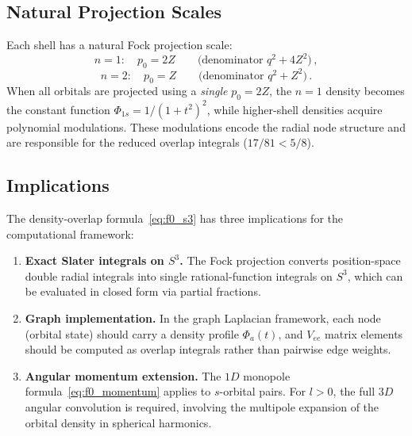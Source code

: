 \subsection{Natural Projection Scales}

Each shell has a natural Fock projection scale:
\begin{equation}
  n = 1: \quad p_0 = 2Z \qquad\text{(denominator } q^2 + 4Z^2\text{)} \,,
\end{equation}
\begin{equation}
  n = 2: \quad p_0 = Z \qquad\text{(denominator } q^2 + Z^2\text{)} \,.
\end{equation}
When all orbitals are projected using a \emph{single} $p_0 = 2Z$, the
$n=1$ density becomes the constant function $\Phi_{1s} = 1/(1+t^2)^2$,
while higher-shell densities acquire polynomial modulations. These
modulations encode the radial node structure and are responsible for
the reduced overlap integrals ($17/81 < 5/8$).

\subsection{Implications}
\label{sec:vee_implications}

The density-overlap formula~\eqref{eq:f0_s3} has three implications
for the computational framework:

\begin{enumerate}
  \item \textbf{Exact Slater integrals on $S^3$.}
    The Fock projection converts position-space double radial integrals
    into single rational-function integrals on $S^3$, which can be
    evaluated in closed form via partial fractions.

  \item \textbf{Graph implementation.}
    In the graph Laplacian framework, each node (orbital state) should
    carry a density profile $\Phi_a(t)$, and $V_{ee}$ matrix elements
    should be computed as overlap integrals rather than pairwise edge
    weights.

  \item \textbf{Angular momentum extension.}
    The $1D$ monopole formula~\eqref{eq:f0_momentum} applies to
    $s$-orbital pairs. For $l > 0$, the full $3D$ angular convolution
    is required, involving the multipole expansion of the orbital
    density in spherical harmonics.
\end{enumerate}
